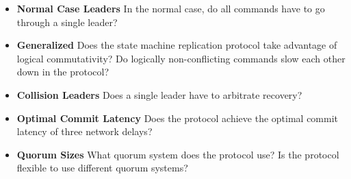 \begin{itemize}
  \item \textbf{Normal Case Leaders}
    In the normal case, do all commands have to go through a single leader?

  \item \textbf{Generalized}
    Does the state machine replication protocol take advantage of logical
    commutativity? Do logically non-conflicting commands slow each other down
    in the protocol?

  \item \textbf{Collision Leaders}
    Does a single leader have to arbitrate recovery?

  \item \textbf{Optimal Commit Latency}
    Does the protocol achieve the optimal commit latency of three network
    delays?

  \item \textbf{Quorum Sizes}
    What quorum system does the protocol use? Is the protocol flexible to use
    different quorum systems?
\end{itemize}
